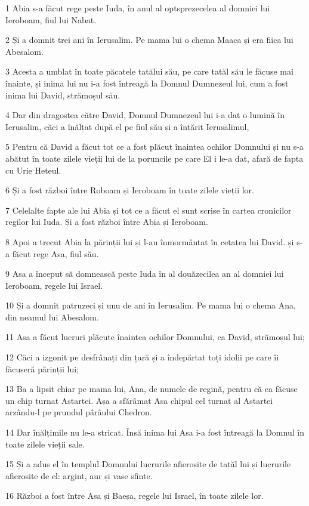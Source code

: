 \par 1 Abia s-a făcut rege peste Iuda, în anul al optsprezecelea al domniei lui Ieroboam, fiul lui Nabat.
\par 2 Și a domnit trei ani în Ierusalim. Pe mama lui o chema Maaca și era fiica lui Abesalom.
\par 3 Acesta a umblat în toate păcatele tatălui său, pe care tatăl său le făcuse mai înainte, și inima lui nu i-a fost întreagă la Domnul Dumnezeul lui, cum a fost inima lui David, strămoșul său.
\par 4 Dar din dragostea către David, Domnul Dumnezeul lui i-a dat o lumină în Ierusalim, căci a înălțat după el pe fiul său și a întărit Ierusalimul,
\par 5 Pentru că David a făcut tot ce a fost plăcut înaintea ochilor Domnului și nu s-a abătut în toate zilele vieții lui de la poruncile pe care El i le-a dat, afară de fapta cu Urie Heteul.
\par 6 Și a fost război între Roboam și Ieroboam în toate zilele vieții lor.
\par 7 Celelalte fapte ale lui Abia și tot ce a făcut el sunt scrise în cartea cronicilor regilor lui Iuda. Și a fost război între Abia și Ieroboam.
\par 8 Apoi a trecut Abia la părinții lui și l-au înmormântat în cetatea lui David. și s-a făcut rege Asa, fiul său.
\par 9 Asa a început să domnească peste Iuda în al douăzecilea an al domniei lui Ieroboam, regele lui Israel.
\par 10 Și a domnit patruzeci și unu de ani în Ierusalim. Pe mama lui o chema Ana, din neamul lui Abesalom.
\par 11 Asa a făcut lucruri plăcute înaintea ochilor Domnului, ca David, strămoșul lui;
\par 12 Căci a izgonit pe desfrânați din țară și a îndepărtat toți idolii pe care îi făcuseră părinții lui;
\par 13 Ba a lipsit chiar pe mama lui, Ana, de numele de regină, pentru că ea făcuse un chip turnat Astartei. Așa a sfărâmat Asa chipul cel turnat al Astartei arzându-l pe prundul pârâului Chedron.
\par 14 Dar înălțimile nu le-a stricat. Însă inima lui Asa i-a fost întreagă la Domnul în toate zilele vieții sale.
\par 15 Și a adus el în templul Domnului lucrurile afierosite de tatăl lui și lucrurile afierosite de el: argint, aur și vase sfinte.
\par 16 Război a fost între Asa și Baeșa, regele lui Israel, în toate zilele lor.
